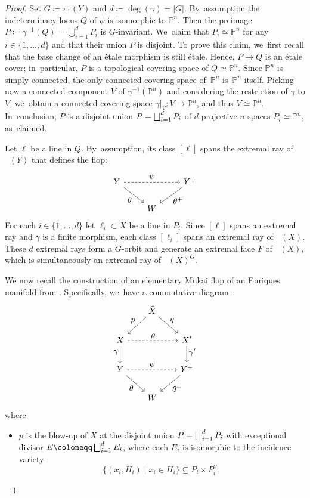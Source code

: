 \documentclass[JEP,XML,SOM,Unicode,published]{cedram}
\let\oldbigsqcup\bigsqcup
\renewcommand{\bigsqcup}{\mathop{\textstyle\oldbigsqcup}\displaylimits}
\let\ts\textstyle
\theoremstyle{plain}
\theoremstyle{definition}
\renewcommand{\P}{\mathbb{P}}
\DeclareMathOperator{\NEb}{\overline{\mathrm{NE}}}
\begin{document}
\begin{proof}
Set $G \coloneqq \pi_1(Y)$ and $d \coloneqq \deg(\gamma) = |G|$. By~assumption the indeterminacy locus $Q$ of $\psi$ is isomorphic to $\mathbb{P}^n$. Then the preimage $P \coloneqq \gamma^{-1} (Q) = \bigcup_{i=1}^d P_i$ is $G$\nobreakdash-invariant. We~claim that $P_i \simeq \P^n$ for any $i \in \{ 1, \dots, d \}$ and that their union $P$ is disjoint. To prove this claim, we~first recall that the base change of an étale morphism is still étale. Hence, $P \to Q$ is an étale cover; in~particular, $P$ is a topological covering space of $Q\simeq \P^n$. Since $\P^n$ is simply connected, the only connected covering space of~$\P^n$ is~$\P^n$ itself. Picking now a connected component $V$ of $\gamma^{-1}(\P^n)$ and considering the restriction of $\gamma$ to $V$, we~obtain a connected covering space $\gamma|_V \colon V \to \P^n$, and thus $V \simeq \P^n$. In~conclusion, $P$ is a disjoint union $P = \bigsqcup_{i=1}^d P_i$ of $d$ projective $n$-spaces $P_i \simeq \P^n$, as~claimed.

Let $\ell$ be a line in $Q$. By~assumption, its class $[\ell]$ spans the extremal ray of $\NEb(Y)$ that defines the flop:\vspace*{-3pt}
\[
\begin{tikzcd}
Y \arrow[rd, "\ts \theta"'] \arrow[rr, "\ts \psi", dashed] & & Y^+ \arrow[ld, "\ts \theta^+"] \\
& W
\end{tikzcd}
\]
For each $i\in \{1,\dots,d\}$ let $\ell_i \subset X$ be a line in $P_i$. Since $[\ell]$ spans an extremal ray and $\gamma$ is a finite morphism, each class $[\ell_i]$ spans an extremal ray of $\NEb(X)$. These $d$ extremal rays form a $G$\nobreakdash-orbit and generate an extremal face $F$ of $\NEb(X)$, which is simultaneously an extremal ray of $\NEb(X)^G$.

We now recall the construction of an elementary Mukai flop of an Enriques manifold from \cite[\S 4, pp.\,1645-1646]{OS11b}. Specifically, we~have a commutative diagram:\vspace*{-3pt}
\[
\begin{tikzcd}[row sep = 2em, column sep = 2em]
& \widehat{X} \ar[ld,swap,"\ts p"] \ar[rd,"\ts q"] \\
X \arrow[d, "\ts \gamma" swap, pos=0.4] \arrow[rr, dashed, "\ts \rho"] & & X' \arrow[d, "\ts \gamma'" pos=0.4] \\
Y \arrow[rd, "\ts \theta" swap] \arrow[rr, dashed, "\ts \psi"] & & Y^+ \arrow[ld, "\ts \theta^+"] \\
& W
\end{tikzcd}
\]
where
\begin{itemize}
\item
$p$ is the blow-up of $X$ at the disjoint union $P = \bigsqcup_{i=1}^d P_i$ with exceptional divisor $E \coloneqq \bigsqcup_{i=1}^d E_i$, where each $E_i$ is isomorphic to the incidence variety
\[
\bigl\{ (x_i,H_i)\mid x_i\in H_i \bigr\} \subseteq P_i\times P_i^\vee,
\]


\end{itemize}
\end{proof}
\end{document}
